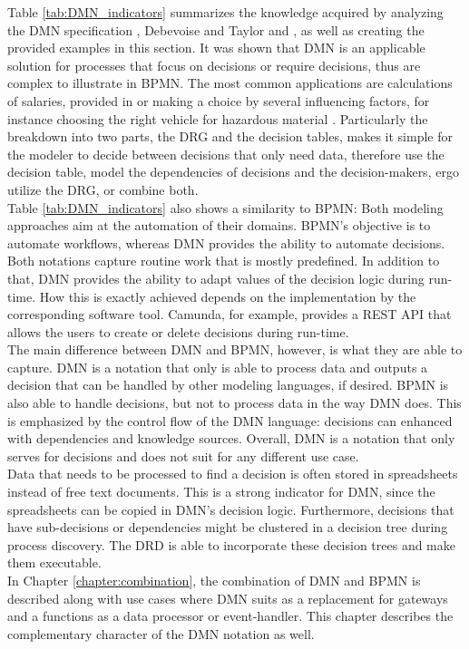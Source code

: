 Table \ref{tab:DMN_indicators} summarizes the knowledge acquired by analyzing the DMN specification \cite{DMNspec2016}, Debevoise and Taylor \cite{DMNmicroguide} and \cite{BiardMauffBigandEtAl2015a}, as well as creating the provided examples in this section. It was shown that DMN is an applicable solution for processes that focus on decisions or require decisions, thus are complex to illustrate in BPMN. The most common applications are calculations of salaries, provided in \cite{DMNspec2016} or making a choice by several influencing factors, for instance choosing the right vehicle for hazardous material \cite{DMNmicroguide}. Particularly the breakdown into two parts, the \acl{DRG} and the decision tables, makes it simple for the modeler to decide between decisions that only need data, therefore use the decision table, model the dependencies of decisions and the decision-makers, ergo utilize the \ac{DRG}, or combine both. \\
Table \ref{tab:DMN_indicators} also shows a similarity to BPMN: Both modeling approaches aim at the automation of their domains. BPMN's objective is to automate workflows, whereas DMN provides the ability to automate decisions. Both notations capture routine work that is mostly predefined. In addition to that, DMN provides the ability to adapt values of the decision logic during run-time. How this is exactly achieved depends on the implementation by the corresponding software tool. Camunda, for example, provides a \ac{REST} API that allows the users to create or delete decisions during run-time. \\
The main difference between DMN and BPMN, however, is what they are able to capture. DMN is a notation that only is able to process data and outputs a decision that can be handled by other modeling languages, if desired. BPMN is also able to handle decisions, but not to process data in the way DMN does. This is emphasized by the control flow of the DMN language: decisions can enhanced with dependencies and knowledge sources. Overall, DMN is a notation that only serves for decisions and does not suit for any different use case. \\
Data that needs to be processed to find a decision is often stored in spreadsheets instead of free text documents. This is a strong indicator for DMN, since the spreadsheets can be copied in DMN's decision logic. Furthermore, decisions that have sub-decisions or dependencies might be clustered in a decision tree during process discovery. The \ac{DRD} is able to  incorporate these decision trees and make them executable. \\
In Chapter \ref{chapter:combination}, the combination of DMN and BPMN is described along with use cases where DMN suits as a replacement for gateways and a functions as a data processor or event-handler. This chapter describes the complementary character of the DMN notation as well.

